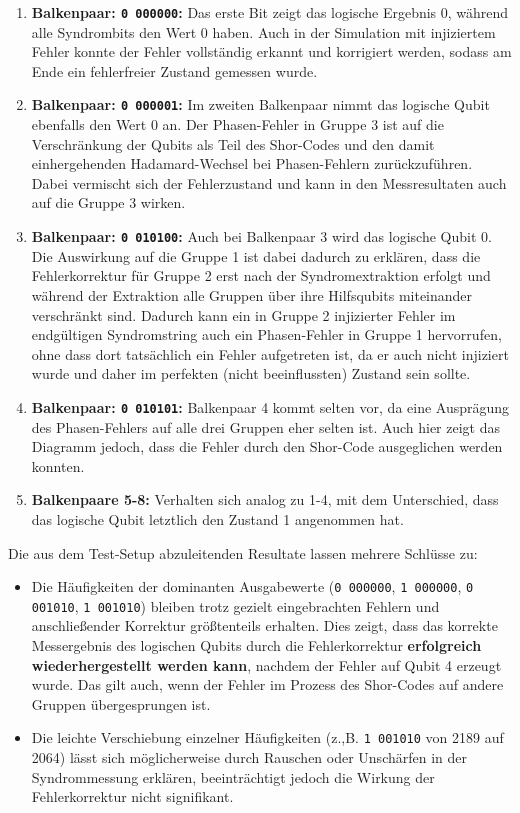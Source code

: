 \begin{enumerate}
    \item \textbf{Balkenpaar: \texttt{0 000000}:} 
    Das erste Bit zeigt das logische Ergebnis 0, während alle Syndrombits den Wert 0 haben. 
    Auch in der Simulation mit injiziertem Fehler konnte der Fehler vollständig erkannt und korrigiert werden, sodass am Ende ein fehlerfreier Zustand gemessen wurde.

    \item \textbf{Balkenpaar: \texttt{0 000001}:}
    Im zweiten Balkenpaar nimmt das logische Qubit ebenfalls den Wert 0 an. Der Phasen-Fehler in Gruppe 3 ist auf die Verschränkung der Qubits als Teil des Shor-Codes und den damit einhergehenden Hadamard-Wechsel bei Phasen-Fehlern zurückzuführen. Dabei vermischt sich der Fehlerzustand und kann in den Messresultaten auch auf die Gruppe 3 wirken.

    
    \item \textbf{Balkenpaar: \texttt{0 010100}:}
    Auch bei Balkenpaar 3 wird das logische Qubit 0. Die Auswirkung auf die Gruppe 1 ist dabei dadurch zu erklären, dass die Fehlerkorrektur für Gruppe 2 erst nach der Syndromextraktion erfolgt und während der Extraktion alle Gruppen über ihre Hilfsqubits miteinander verschränkt sind.
    Dadurch kann ein in Gruppe 2 injizierter Fehler im endgültigen Syndromstring auch ein Phasen-Fehler in Gruppe 1 hervorrufen, ohne dass dort tatsächlich ein Fehler aufgetreten ist, da er auch nicht injiziert wurde und daher im perfekten (nicht beeinflussten) Zustand sein sollte.
    \item \textbf{Balkenpaar: \texttt{0 010101}:}
    Balkenpaar 4 kommt selten vor, da eine Ausprägung des Phasen-Fehlers auf alle drei Gruppen eher selten ist. Auch hier zeigt das Diagramm jedoch, dass die Fehler durch den Shor-Code ausgeglichen werden konnten.
    \item \textbf{Balkenpaare 5-8:} 
    Verhalten sich analog zu 1-4, mit dem Unterschied, dass das logische Qubit letztlich den Zustand 1 angenommen hat.
\end{enumerate}


Die aus dem Test-Setup abzuleitenden Resultate lassen mehrere Schlüsse zu:

\begin{itemize}
    \item Die Häufigkeiten der dominanten Ausgabewerte (\texttt{0 000000}, \texttt{1 000000}, \texttt{0 001010}, \texttt{1 001010}) bleiben trotz gezielt eingebrachten Fehlern und anschließender Korrektur größtenteils erhalten. Dies zeigt, dass das korrekte Messergebnis des logischen Qubits durch die Fehlerkorrektur \textbf{erfolgreich wiederhergestellt werden kann}, nachdem der Fehler auf Qubit 4 erzeugt wurde. Das gilt auch, wenn der Fehler im Prozess des Shor-Codes auf andere Gruppen übergesprungen ist.
    \medskip
    \item Die leichte Verschiebung einzelner Häufigkeiten (z.,B. \texttt{1 001010} von 2189 auf 2064) lässt sich möglicherweise durch Rauschen oder Unschärfen in der Syndrommessung erklären, beeinträchtigt jedoch die Wirkung der Fehlerkorrektur nicht signifikant.
\end{itemize}



